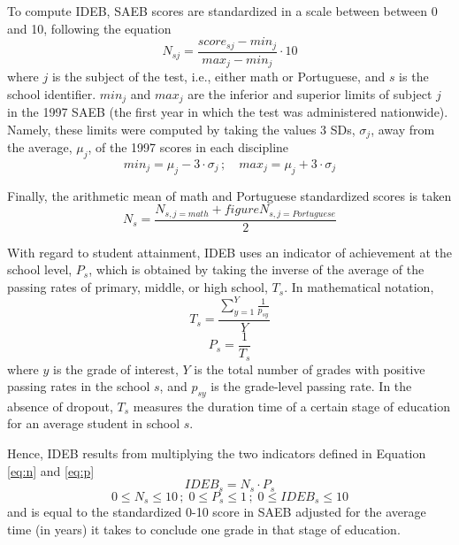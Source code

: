 \documentclass[11pt,a4paper]{article}
\begin{document}
	To compute IDEB, SAEB scores are standardized in a scale between between 0 and 10, following the equation
	\begin{equation}
	N_{sj} = \frac{score_{sj} - min_j}{max_j - min_j} \cdot 10
	\end{equation}
	where $j$ is the subject of the test, i.e., either math or Portuguese, and $s$ is the school identifier. $min_j$ and $max_j$ are the inferior and superior limits of subject $j$ in the 1997 SAEB (the first year in which the test was administered nationwide). Namely, these limits were computed by taking the values 3 SDs, $\sigma_{j}$, away from the average, $\mu_{j}$, of the 1997 scores in each discipline
	\begin{equation}
	min_{j} = \mu_{j} - 3 \cdot \sigma_{j}\,;\quad max_{j} = \mu_{j} + 3 \cdot \sigma_{j}
	\end{equation}
	
	Finally, the arithmetic mean of math and Portuguese standardized scores is taken
	\begin{equation} \label{eq:n}
	N_{s} = \frac{N_{s,j=math} +figure N_{s,j=Portuguese}}{2}
	\end{equation}
	
	With regard to student attainment, IDEB uses an indicator of achievement at the school level, $P_s$, which is obtained by taking the inverse of the average of the passing rates of primary, middle, or high school, $T_s$. In mathematical notation,
	\begin{equation} 
	T_s = \frac{\sum_{y=1}^{Y} \frac{1}{p_{sy}}}{Y}
	\end{equation}
	\begin{equation} \label{eq:p}
	P_s = \frac{1}{T_s}
	\end{equation}
	where $y$ is the grade of interest, $Y$ is the total number of grades with positive passing rates in the school $s$, and $p_{sy}$ is the grade-level passing rate. In the absence of dropout, $T_s$ measures the duration time of a certain stage of education for an average student in school $s$. 
	
	Hence, IDEB results from multiplying the two indicators defined in Equation \ref{eq:n} and \ref{eq:p}
	\begin{equation}
	IDEB_s = N_s \cdot P_s
	\end{equation}
	\begin{equation}
	0 \leq N_s \leq 10\,;\; 0 \leq P_s \leq 1\,;\; 0 \leq IDEB_s \leq 10
	\end{equation}
	and is equal to the standardized 0-10 score in SAEB adjusted for the average time (in years) it takes to conclude one grade in that stage of education.
	
\end{document}

